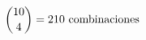 \documentclass[preview]{standalone}
\begin{document}
\begin{align*}
\special{dvisvgm:raw <g id='unique000'>}\binom{10}{4} = 210 \text{ combinaciones}\special{dvisvgm:raw </g>}
\end{align*}
\end{document}
